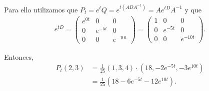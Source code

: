 Para ello utilizamos que $P_t = e^tQ = e^{t(ADA^{-1})} = Ae^{tD}A^{-1}$ y que
\begin{align}
    e^{tD}  =   
                \begin{pmatrix}
                    e^{0 t} &   0           &   0      \\
                    0       &   e^{-5 t}    &   0      \\
                    0       &   0           &   e^{-10 t}
                \end{pmatrix}
            =   
                \begin{pmatrix}
                    1       &   0           &   0      \\
                    0       &   e^{-5 t}    &   0      \\
                    0       &   0           &   e^{-10 t}
                \end{pmatrix}.
\end{align}

Entonces, 
\begin{align}
        P_t(2,3) &= \frac{1}{25} (1,3,4) \cdot (18, -2e^{-5t}, -3e^{10t})                                                                                 \\
                 &= \frac{1}{25} (18 - 6e^{-5t} - 12e^{10t}).                                                                                                \\
\end{align}